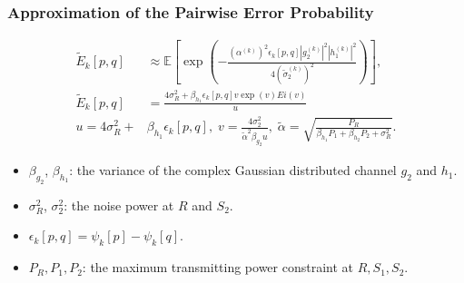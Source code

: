 \documentclass{beamer}
\begin{document}
\begin{frame}
  \frametitle{Approximation of the Pairwise Error Probability}
  \begin{align*}
    \tilde{E}_k[p,q] & \approx \mathbb{E} \left[\exp\left(
    -\frac{(\alpha^{(k)})^2\epsilon_k[p,q]|g_2^{(k)}|^2 |h_1^{(k)}|^2}
    {4(\tilde{\sigma}_2^{(k)})^2} \right)\right],\\
    \tilde{E}_k[p,q] & = \frac{4\sigma_R^2
    + \beta_{h_1}\epsilon_k[p,q]v\exp(v)Ei(v)}{u}
    \\
    u = 4\sigma_R^2 + & \beta_{h_1}\epsilon_k[p,q],\;
    v =
    \frac{4\sigma_2^2}{\tilde{\alpha}^2\beta_{g_2}u},\;
    \tilde{\alpha} = \sqrt{\frac{P_R}{\beta_{h_1}P_1 +
    \beta_{h_2}P_2+\sigma_R^2}}.
  \end{align*}
  \begin{itemize}
    \item $\beta_{g_2}$, $\beta_{h_1}$: the variance of the complex Gaussian
    distributed channel $g_2$ and $h_1$.
    \item $\sigma_R^2$, $\sigma_2^2$: the noise power at $R$ and $S_2$.
    \item $\epsilon_k[p,q] = \psi_k[p] - \psi_k[q].$
    \item $P_R, P_1, P_2$: the maximum transmitting power constraint at
    $R,S_1,S_2$.
  \end{itemize}
\end{frame}
\end{document}
